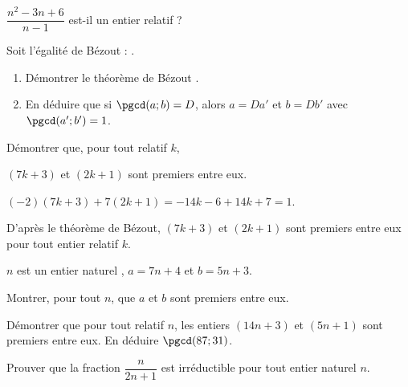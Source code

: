 \documentclass{cornouaille}
\begin{document}
\begin{colonne*exercice}
\begin{exercice}
\begin{enumerate}
$\dfrac{n^2-3n+6}{n-1}$ est-il un entier relatif ?
\end{enumerate}
\end{exercice}



\begin{exercice}
Soit l’égalité de Bézout : .
\begin{enumerate}
\item Démontrer le théorème de Bézout .
\item En déduire que si $\pgcd(a;b) = D$, alors $a = Da'$ et $b = Db'$ avec $\pgcd(a'; b') = 1$.
\end{enumerate}
\end{exercice}

\columnbreak

\begin{exercice*}
\label{exo-bezout}
Démontrer que, pour tout relatif $k$,

$(7k+3)$ et $(2k+1)$ sont premiers entre eux.
\end{exercice*}
\begin{corrige}
  $(-2)(7k+3)+7(2k+1)=-14k-6+14k+7=1$.

  D'après le théorème de Bézout, $(7k+3)$ et $(2k+1)$ sont premiers
  entre eux pour tout entier relatif $k$.
\end{corrige}

\begin{exercice}
$n$ est un entier naturel , $a=7n+4$ et $b=5n+3$.

Montrer, pour tout $n$, que $a$ et $b$ sont premiers entre eux.
\end{exercice}

\begin{exercice}
Démontrer que pour tout relatif $n$, les entiers $(14n+3)$ et $(5n+1)$ sont premiers entre eux. En déduire $\pgcd(87;31)$.
\end{exercice}

\begin{exercice}
Prouver que la fraction $\dfrac{n}{2n+1}$ est irréductible pour tout entier naturel $n$.
\end{exercice}


\end{colonne*exercice}
\end{document}
